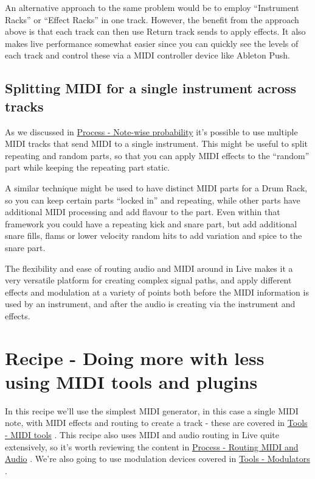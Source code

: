 \documentclass[
  12pt,
  letterpaper,
  oneside,
  open=any]{scrbook}
\makeatletter
\newcommand*\pandocbounded[1]{%
  \sbox\pandoc@box{#1}%
  \Gscale@div\@tempa{\textheight}{\dimexpr\ht\pandoc@box+\dp\pandoc@box\relax}%
  \Gscale@div\@tempb{\linewidth}{\wd\pandoc@box}%
  \ifdim\@tempb\p@<\@tempa\p@\let\@tempa\@tempb\fi%
  \ifdim\@tempa\p@<\p@\scalebox{\@tempa}{\usebox\pandoc@box}%
  \else\usebox{\pandoc@box}%
  \fi%
}
\makeatother
\begin{document}
An alternative approach to the same problem would be to employ
``Instrument Racks'' or ``Effect Racks'' in one track. However, the
benefit from the approach above is that each track can then use Return
track sends to apply effects. It also makes live performance somewhat
easier since you can quickly see the levels of each track and control
these via a MIDI controller device like Ableton Push.

\pandocbounded{\texttt{[image: images/Routing.png]}}

\section{Splitting MIDI for a single instrument across
tracks}\label{splitting-midi-for-a-single-instrument-across-tracks}

As we discussed in
\hyperref[Chapter-002-Process-Note_wise_probability]{Process - Note-wise
probability} it's possible to use multiple MIDI tracks that send MIDI to
a single instrument. This might be useful to split repeating and random
parts, so that you can apply MIDI effects to the ``random'' part while
keeping the repeating part static.

A similar technique might be used to have distinct MIDI parts for a Drum
Rack, so you can keep certain parts ``locked in'' and repeating, while
other parts have additional MIDI processing and add flavour to the part.
Even within that framework you could have a repeating kick and snare
part, but add additional snare fills, flams or lower velocity random
hits to add variation and spice to the snare part.

The flexibility and ease of routing audio and MIDI around in Live makes
it a very versatile platform for creating complex signal paths, and
apply different effects and modulation at a variety of points both
before the MIDI information is used by an instrument, and after the
audio is creating via the instrument and effects.


\chapter{Recipe - Doing more with less using MIDI tools and
plugins}\label{Chapter-006-Recipe-MIDI_tools}

In this recipe we'll use the simplest MIDI generator, in this case a
single MIDI note, with MIDI effects and routing to create a track -
these are covered in \hyperref[Chapter-004-Tools-MIDI_tools]{Tools -
MIDI tools} . This recipe also uses MIDI and audio routing in Live quite
extensively, so it's worth reviewing the content in
\hyperref[Chapter-005-Process-Routing]{Process - Routing MIDI and Audio}
. We're also going to use modulation devices covered in
\hyperref[Chapter-007-Tools-Modulators]{Tools - Modulators} .
\end{document}
